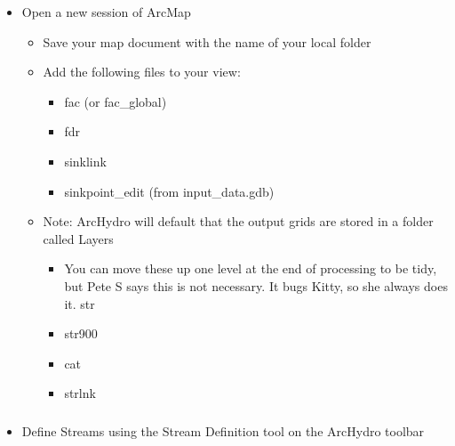 \documentclass[letterpaper,10pt,english]{sphinxmanual}
\begin{document}
\begin{itemize}
\item {} 
Open a new session of ArcMap
\begin{itemize}
\item {} 
Save your map document with the name of your local folder

\item {} 
Add the following files to your view:
\begin{itemize}
\item {} 
fac (or fac\_global)

\item {} 
fdr

\item {} 
sinklink

\item {} 
sinkpoint\_edit (from input\_data.gdb)

\end{itemize}

\item {} 
Note: ArcHydro will default that the output grids are stored in a folder called Layers
\begin{itemize}
\item {} 
You can move these up one level at the end of processing to be tidy, but Pete S says this is not necessary. It bugs Kitty, so she always does it. str

\item {} 
str900

\item {} 
cat

\item {} 
strlnk

\end{itemize}

\end{itemize}

\end{itemize}


\subparagraph{}
\label{\detokenize{ex_2:stream-and-sink-combination}}\begin{itemize}
\item {} 
Define Streams using the Stream Definition tool on the ArcHydro toolbar

\end{itemize}
\end{document}
